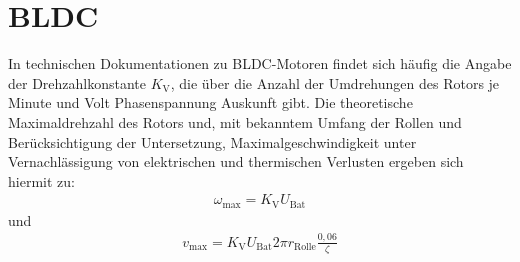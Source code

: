 	\section{BLDC}
		In technischen Dokumentationen zu BLDC-Motoren findet sich häufig die Angabe der Drehzahlkonstante \(K_\text{V}\), die über die Anzahl der Umdrehungen des Rotors je Minute und Volt Phasenspannung Auskunft gibt.
		Die theoretische Maximaldrehzahl des Rotors und, mit bekanntem Umfang der Rollen und Berücksichtigung der Untersetzung, Maximalgeschwindigkeit unter Vernachlässigung von elektrischen und thermischen Verlusten ergeben sich hiermit zu:
		\begin{align}
			\omega_\text{max} = K_\text{V} U_\text{Bat}
			\label{eq:max rpm}
		\end{align}
		und
		\begin{align}
			v_\text{max} = K_\text{V} U_\text{Bat} 2\pi r_\text{Rolle} \frac{0,06}{\zeta}
			\label{eq:max speed km h}
		\end{align}
		
